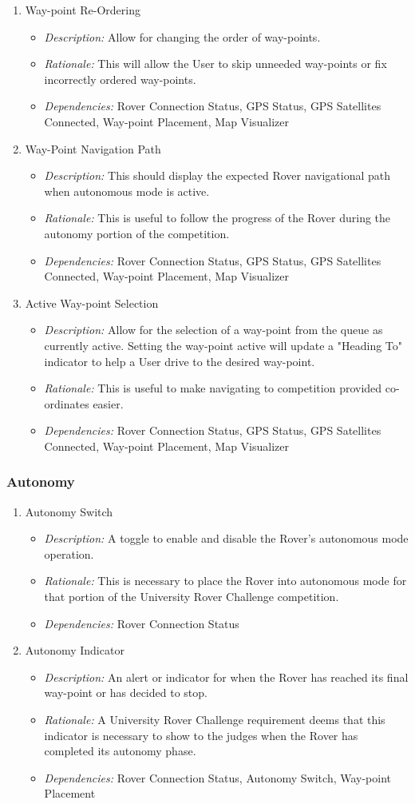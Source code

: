 \documentclass[onecolumn, draftclsnofoot, 10pt, compsoc]{IEEEtran}
\newcommand{\functRequ}[4]{
\item #1%
\par
\begin{itemize}
\item \textit{Description:} #2.%
\item \textit{Rationale:} #3.%
\item \textit{Dependencies:} #4%
\end{itemize}
}
\begin{document}
\begin{enumerate}
\functRequ{Way-point Re-Ordering}
{Allow for changing the order of way-points}
{This will allow the User to skip unneeded way-points or fix incorrectly ordered way-points}
{Rover Connection Status, GPS Status, GPS Satellites Connected, Way-point Placement, Map Visualizer}

\functRequ{Way-Point Navigation Path}
{This should display the expected Rover navigational path when autonomous mode is active}
{This is useful to follow the progress of the Rover during the autonomy portion of the competition}
{Rover Connection Status, GPS Status, GPS Satellites Connected, Way-point Placement, Map Visualizer}

\functRequ{Active Way-point Selection}
{Allow for the selection of a way-point from the queue as currently active.
Setting the way-point active will update a "Heading To" indicator to help a User drive to the desired way-point}
{This is useful to make navigating to competition provided co-ordinates easier}
{Rover Connection Status, GPS Status, GPS Satellites Connected, Way-point Placement, Map Visualizer}

\end{enumerate}
\subsubsection{Autonomy}
\begin{enumerate}
\functRequ{Autonomy Switch}
{A toggle to enable and disable the Rover's autonomous mode operation}
{This is necessary to place the Rover into autonomous mode for that portion of the University Rover Challenge competition}
{Rover Connection Status}

\functRequ{Autonomy Indicator}
{An alert or indicator for when the Rover has reached its final way-point or has decided to stop}
{A University Rover Challenge requirement deems that this indicator is necessary to show to the judges when the Rover has completed its autonomy phase}
{Rover Connection Status, Autonomy Switch, Way-point Placement}
\end{enumerate}
\end{document}
